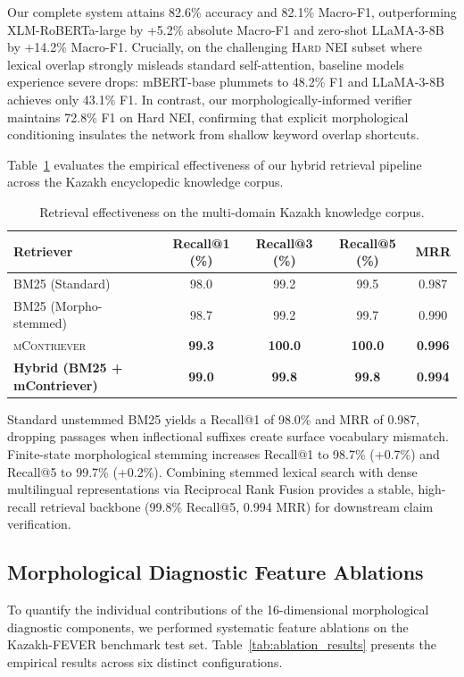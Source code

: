 Our complete system attains 82.6\% accuracy and 82.1\% Macro-F1, outperforming XLM-RoBERTa-large by +5.2\% absolute Macro-F1 and zero-shot LLaMA-3-8B by +14.2\% Macro-F1. Crucially, on the challenging \textsc{Hard NEI} subset where lexical overlap strongly misleads standard self-attention, baseline models experience severe drops: mBERT-base plummets to 48.2\% F1 and LLaMA-3-8B achieves only 43.1\% F1. In contrast, our morphologically-informed verifier maintains 72.8\% F1 on Hard NEI, confirming that explicit morphological conditioning insulates the network from shallow keyword overlap shortcuts.

Table~\ref{tab:retrieval_results} evaluates the empirical effectiveness of our hybrid retrieval pipeline across the Kazakh encyclopedic knowledge corpus.

\begin{table}[ht]
\centering
\small
\setlength{\tabcolsep}{4pt}
\caption{Retrieval effectiveness on the multi-domain Kazakh knowledge corpus.}
\label{tab:retrieval_results}
\begin{tabular}{lcccc}
\toprule
\textbf{Retriever} & \textbf{Recall@1 (\%)} & \textbf{Recall@3 (\%)} & \textbf{Recall@5 (\%)} & \textbf{MRR} \\
\midrule
BM25 (Standard) & 98.0 & 99.2 & 99.5 & 0.987 \\
BM25 (Morpho-stemmed) & 98.7 & 99.2 & 99.7 & 0.990 \\
\textsc{mContriever} & \textbf{99.3} & \textbf{100.0} & \textbf{100.0} & \textbf{0.996} \\
\midrule
\textbf{Hybrid (BM25 + mContriever)} & \textbf{99.0} & \textbf{99.8} & \textbf{99.8} & \textbf{0.994} \\
\bottomrule
\end{tabular}
\end{table}

Standard unstemmed BM25 yields a Recall@1 of 98.0\% and MRR of 0.987, dropping passages when inflectional suffixes create surface vocabulary mismatch. Finite-state morphological stemming increases Recall@1 to 98.7\% (+0.7\%) and Recall@5 to 99.7\% (+0.2\%). Combining stemmed lexical search with dense multilingual representations via Reciprocal Rank Fusion provides a stable, high-recall retrieval backbone (99.8\% Recall@5, 0.994 MRR) for downstream claim verification.

\subsection{Morphological Diagnostic Feature Ablations}
\label{sec:morphological_ablations}
To quantify the individual contributions of the 16-dimensional morphological diagnostic components, we performed systematic feature ablations on the Kazakh-FEVER benchmark test set. Table~\ref{tab:ablation_results} presents the empirical results across six distinct configurations.


